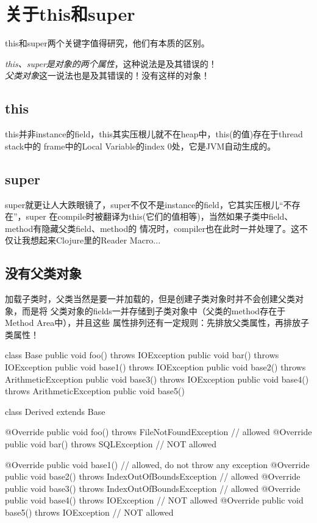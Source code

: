 ﻿\section[关于this和super]{关于this和super}
this和super两个关键字值得研究，他们有本质的区别。

\emph{this、super是对象的两个属性}，这种说法是及其错误的！\\
\emph{父类对象}这一说法也是及其错误的！没有这样的对象！

\subsection[this]{this}
this并非instance的field，this其实压根儿就不在heap中，this(的值)存在于thread stack中的
frame中的Local Variable的index 0处，它是JVM自动生成的。

\subsection[super]{super}
super就更让人大跌眼镜了，super不仅不是instance的field，它其实压根儿“不存在”，super
在compile时被翻译为this(它们的值相等)，当然如果子类中field、method有隐藏父类field、method的
情况时，compiler也在此时一并处理了。这不仅让我想起来Clojure里的Reader Macro...

\subsection[没有父类对象]{没有父类对象}
加载子类时，父类当然是要一并加载的，但是创建子类对象时并不会创建父类对象，而是将
父类对象的fields一并存储到子类对象中（父类的method存在于Method Area中），并且这些
属性排列还有一定规则：先排放父类属性，再排放子类属性！

\begin{javacode}
class Base {
  public void foo() throws IOException { }
  public void bar() throws IOException { }
  public void base1() throws IOException { }
  public void base2() throws ArithmeticException { }
  public void base3() throws IOException { }
  public void base4() throws ArithmeticException { }
  public void base5() { }
}

class Derived extends Base {
  @Override
  public void foo() throws FileNotFoundException { } // allowed
  @Override
  public void bar() throws SQLException { } // NOT allowed

  @Override
  public void base1() { } // allowed, do not throw any exception
  @Override
  public void base2() throws IndexOutOfBoundsException { } // allowed
  @Override
  public void base3() throws IndexOutOfBoundsException { } // allowed
  @Override
  public void base4() throws IOException { } // NOT allowed
  @Override
  public void base5() throws IOException { } // NOT allowed
}
\end{javacode}

